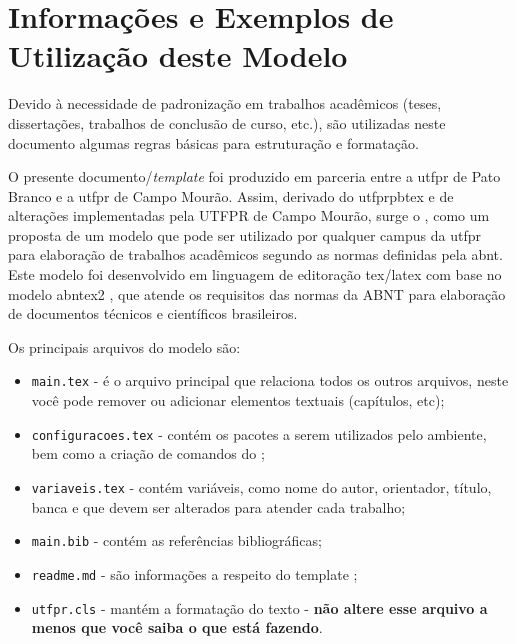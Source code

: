 
\chapter{Informações e Exemplos de Utilização deste Modelo}\label{cap:exemplo}

Devido à necessidade de padronização em trabalhos acadêmicos (teses, dissertações, trabalhos de conclusão de curso, etc.), são utilizadas neste documento algumas regras básicas para estruturação e formatação.

O presente documento/\textit{template} foi produzido em parceria entre a \gls{utfpr} de Pato Branco e a \gls{utfpr} de Campo Mourão. Assim, derivado do \gls{utfprpbtex} e de alterações implementadas pela UTFPR de Campo Mourão, surge o \utfprtex, como um proposta de um modelo \latex que pode ser utilizado por qualquer campus da \gls{utfpr} para elaboração de trabalhos acadêmicos segundo as normas definidas pela \gls{abnt}. Este modelo foi desenvolvido em linguagem de editoração \gls{tex}/\gls{latex} com base no modelo \gls{abntex2} \cite{abnTeX2:2013}, que atende os requisitos das normas da ABNT para elaboração de documentos técnicos e científicos brasileiros.

Os principais arquivos do modelo são: 
\begin{itemize}
    \item \texttt{main.tex} - é o arquivo principal que relaciona todos os outros arquivos, neste você pode remover ou adicionar elementos textuais (capítulos, etc);
    \item \texttt{configuracoes.tex} - contém os pacotes a serem utilizados pelo ambiente, bem como a criação de comandos do \latex;
    \item \texttt{variaveis.tex} - contém variáveis, como nome do autor, orientador, título, banca e que devem ser alterados para atender cada trabalho;
    \item \texttt{main.bib} - contém as referências bibliográficas;
    \item \texttt{readme.md} - são informações a respeito do template \latex;
    \item \texttt{utfpr.cls} - mantém a formatação do texto - \textbf{não altere esse arquivo a menos que você saiba o que está fazendo}.
\end{itemize}

